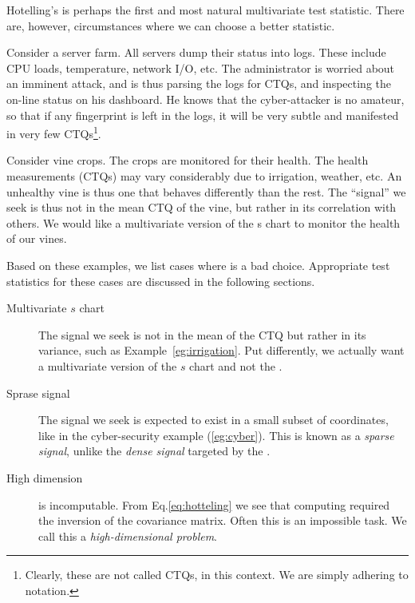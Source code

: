 Hotelling's \tsq is perhaps the first and most natural multivariate test statistic.
There are, however, circumstances where we can choose a better statistic.


\begin{example}
\label{eg:cyber}
Consider a server farm. 
All servers dump their status into logs. These include CPU loads, temperature, network I/O, etc.
The administrator is worried about an imminent attack, and is thus parsing the logs for CTQs, and inspecting the on-line status on his dashboard.
He knows that the cyber-attacker is no amateur, so that if any fingerprint is left in the logs, it will be very subtle and manifested in very few CTQs\footnote{Clearly, these are not called CTQs, in this context. We are simply adhering to notation.}.
\end{example}


\begin{example}
\label{eg:irrigation}
Consider vine crops.
The crops are monitored for their health.
The health measurements (CTQs) may vary considerably due to irrigation, weather, etc.
An unhealthy vine is thus one that behaves differently than the rest. 
The ``signal'' we seek is thus not in the mean CTQ of the vine, but rather in its correlation with others. 
We would like a multivariate version of the s chart to monitor the health of our vines.  
\end{example}


Based on these examples, we list cases where \tsq is a bad choice. Appropriate test statistics for these cases are discussed in the following sections.
\begin{description}

\item [Multivariate $s$ chart] The signal we seek is not in the mean of the CTQ but rather in its variance, such as Example~\ref{eg:irrigation}. Put differently, we actually want a multivariate version of the $s$ chart and not the \barxChart. 

\item [Sprase signal] The signal we seek is expected to exist in a small subset of coordinates, like in the cyber-security example (\ref{eg:cyber}). This is known as a \emph{sparse signal}, unlike the \emph{dense signal} targeted by the \tsq. 

\item [High dimension] \tsq is incomputable. From Eq.\ref{eq:hotteling} we see that computing \tsq required the inversion of the covariance matrix. Often this is an impossible task. We call this a \emph{high-dimensional problem}.
\end{description}




